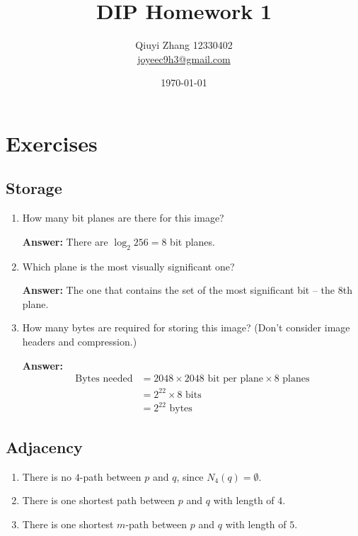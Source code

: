 \documentclass{article}
\begin{document}
\title{DIP Homework 1}
\author{Qiuyi Zhang 12330402 \\ \href{mailto:joyeec9h3@gmail.com}{joyeec9h3@gmail.com}} 
\date{\today}
\maketitle

\section{Exercises}

\subsection{Storage}
\begin{enumerate}
\item How many bit planes are there for this image?

\textbf{Answer:} There are $\log_{2} 256 = 8$ bit planes.

\item Which plane is the most visually significant one?

\textbf{Answer:} The one that contains the set of the most significant bit -- the 8th plane.

\item How many bytes are required for storing this image? (Don’t consider image headers and compression.)

\textbf{Answer:} 
\begin{align*} 
\textrm{Bytes needed} & = 2048 \times 2048\textrm{ bit per plane} \times 8\textrm{ planes} \\
 & = 2^{22} \times 8\textrm{ bits} \\
 & = 2^{22}\textrm{ bytes}
\end{align*}
\end{enumerate}

\subsection{Adjacency}

\begin{enumerate}
\item There is no $4$-path between $p$ and $q$, since $N_{4}(q) = \emptyset$.
\item There is one shortest path between $p$ and $q$ with length of $4$.
\item There is one shortest $m$-path between $p$ and $q$ with length of $5$.
\end{enumerate}
\end{document}

